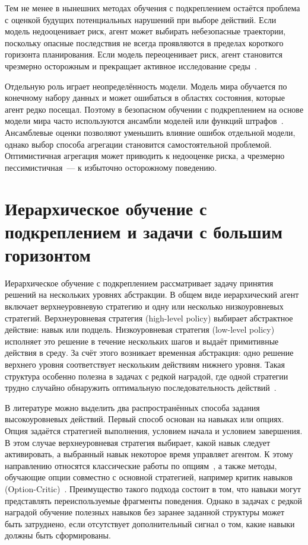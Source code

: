 Тем не менее в нынешних методах обучения с подкреплением остаётся проблема с оценкой будущих потенциальных нарушений при выборе действий. Если модель недооценивает риск, агент может выбирать небезопасные траектории, поскольку опасные последствия не всегда проявляются в пределах короткого горизонта планирования. Если модель переоценивает риск, агент становится чрезмерно осторожным и прекращает активное исследование среды~\cite{sikchi2022loop,moerland2023model}.

Отдельную роль играет неопределённость модели. Модель мира обучается по конечному набору данных и может ошибаться в областях состояния, которые агент редко посещал. Поэтому в безопасном обучении с подкреплением на основе модели мира часто используются ансамбли моделей или функций штрафов~\cite{liu2020mbrce,jayant2022model,as2022lambda}. Ансамблевые оценки позволяют уменьшить влияние ошибок отдельной модели, однако выбор способа агрегации становится самостоятельной проблемой. Оптимистичная агрегация может приводить к недооценке риска, а чрезмерно пессимистичная~--- к избыточно осторожному поведению.

\section{Иерархическое обучение с подкреплением и задачи с большим горизонтом}
\label{sec:hrl}

Иерархическое обучение с подкреплением рассматривает задачу принятия решений на нескольких уровнях абстракции. В общем виде иерархический агент включает верхнеуровневую стратегию и одну или несколько низкоуровневых стратегий. Верхнеуровневая стратегия (high-level policy) выбирает абстрактное действие: навык или подцель. Низкоуровневая стратегия (low-level policy) исполняет это решение в течение нескольких шагов и выдаёт примитивные действия в среду. За счёт этого возникает временная абстракция: одно решение верхнего уровня соответствует нескольким действиям нижнего уровня. Такая структура особенно полезна в задачах с редкой наградой, где одной стратегии трудно случайно обнаружить оптимальную последовательность действий~\cite{pateria2021hrl}.

В литературе можно выделить два распространённых способа задания высокоуровневых действий. Первый способ основан на навыках или опциях. Опция задаётся стратегией выполнения, условием начала и условием завершения. В этом случае верхнеуровневая стратегия выбирает, какой навык следует активировать, а выбранный навык некоторое время управляет агентом. К этому направлению относятся классические работы по опциям~\cite{sutton1999options}, а также методы, обучающие опции совместно с основной стратегией, например критик навыков (Option-Critic)~\cite{bacon2017optioncritic}. Преимущество такого подхода состоит в том, что навыки могут представлять переиспользуемые фрагменты поведения. Однако в задачах с редкой наградой обучение полезных навыков без заранее заданной структуры может быть затруднено, если отсутствует дополнительный сигнал о том, какие навыки должны быть сформированы.

